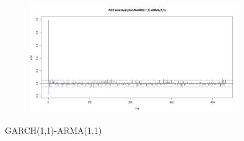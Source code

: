 \documentclass[12pt]{article}
\begin{document}
\begin{figure}[H]
\begin{subfigure}[b]{0.6\linewidth}
  \end{subfigure}
  \begin{subfigure}[b]{0.6\linewidth}
    \includegraphics[width=\linewidth]{figure27-4.png}
  \end{subfigure}
  \caption{GARCH(1,1)-ARMA(1,1)}
  \label{fig:figure28}
\end{figure}
\end{document}
